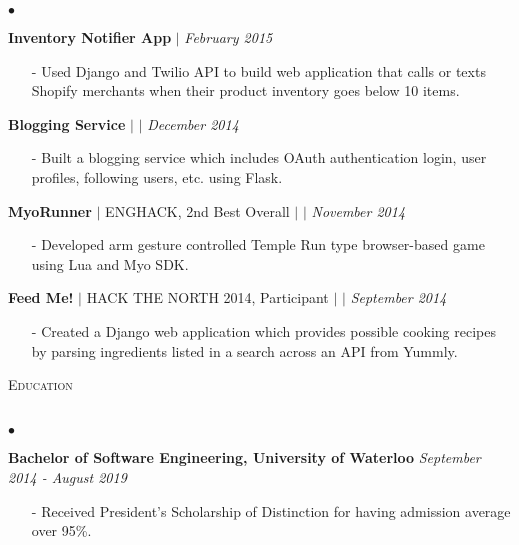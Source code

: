 \documentclass[10pt]{article}
\newcommand{\lineunder}{\vspace*{-8pt} \\ \hspace*{-18pt} \hrulefill \\}
\newcommand{\header}[1]{{\hspace*{-15pt}\vspace*{6pt} \textsc{#1}} \vspace*{-6pt} \lineunder }
\newenvironment{achievements}{\begin{list}{$\bullet$}{\topsep 0pt \itemsep -1.5pt \leftmargin 5pt}}{\vspace*{4pt}\end{list}}
\begin{document}
\begin{achievements}
\begin{itemize}
\end{itemize}
\vspace{5pt}
\item \textbf{Inventory Notifier App} $|$  \href{https://github.com/nakulpathak3/twilio-shopify-notifier}{\faGithub} \hfill \textit {February 2015}
\begin{itemize}
\item[-]Used Django and Twilio API to build web application that calls or texts Shopify merchants when their product inventory goes below 10 items.
\end{itemize}
\vspace{5pt}
\item \textbf{Blogging Service} $|$  \href{https://github.com/nakulpathak3/complete-microblog-flask}{\faGithub}  $|$ \href{http://nakul-microblog.herokuapp.com/}{\faExternalLink}  \hfill \textit {December 2014}
\begin{itemize}
\item[-]Built a blogging service which includes OAuth authentication login, user profiles, following users, etc. using Flask.
\end{itemize}
\vspace{5pt}
\item\textbf{MyoRunner} {$|$ \scriptsize ENGHACK, 2nd Best Overall }  $|$  \href{https://github.com/nakulpathak3/myorunner}{\faGithub} $|$ \href{http://jhudson.ca/myorunaway}{\faExternalLink}\hfill \textit {November 2014}
\begin{itemize}
\item[-]Developed arm gesture controlled Temple Run type browser-based game using Lua and Myo SDK.
\end{itemize}
\vspace{5pt}
\item \textbf{Feed Me!} {$|$ \scriptsize HACK THE NORTH 2014, Participant}   $|$  \href{https://github.com/nakulpathak3/FeedMe}{\faGithub}   $|$  \href{http://nakul-feedme.herokuapp.com/}{\faExternalLink}\hfill \textit {September 2014}
\begin{itemize}
\item[-]Created a Django web application which provides possible cooking recipes by parsing ingredients listed in a search across an API from Yummly.
\end{itemize}
\end{achievements}

\vspace{10pt}

\header{\fontsize{11}{12}\selectfont  Education}
\begin{achievements}
\item \textbf{Bachelor of Software Engineering, University of Waterloo} \hfill \textit {September 2014 - August 2019}
\begin{itemize}
\vspace{2pt}
\item[-]Received President’s Scholarship of Distinction for having admission average over 95\%.
\vspace{2pt}
\end{itemize}
\end{achievements}
\end{document}
